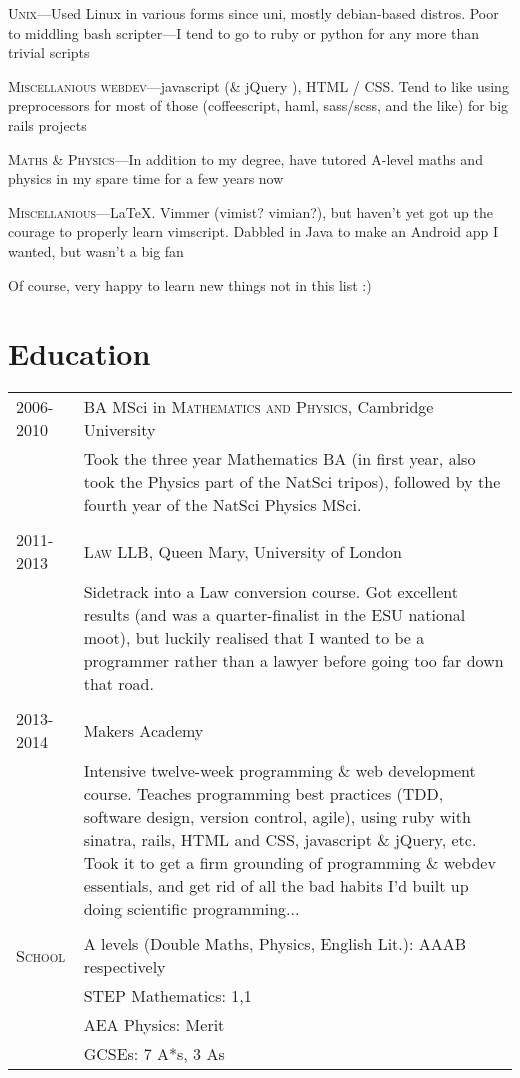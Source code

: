 \documentclass[a4paper,10pt]{article}
\begin{document}
\textsc{Unix}---Used Linux in various forms since uni, mostly debian-based
distros. Poor to middling bash scripter---I tend to go to ruby or python for any more than trivial scripts

\textsc{Miscellanious webdev}---javascript (\& jQuery ), HTML / CSS. Tend to like using preprocessors for most of those (coffeescript, haml, sass/scss, and the like) for big rails projects

\textsc{Maths \& Physics}---In addition to my degree, have tutored A-level maths and physics in my spare time for a few years now

\textsc{Miscellanious}---LaTeX. Vimmer (vimist? vimian?), but haven't yet got up the courage to properly learn vimscript. Dabbled in Java to make an Android app I wanted, but wasn't a big fan

Of course, very happy to learn new things not in this list :)



\section{Education}
\begin{tabularx}{\linewidth}{>{\raggedleft\hsize=0.42\hsize}X>{\hsize=1.5\hsize}X} 
  \textsc{2006-2010} & BA MSci in \textsc{Mathematics and Physics}, Cambridge University\\
  & \footnotesize{Took the three year Mathematics BA (in first year, also took the Physics part 
  of the NatSci tripos), followed by the fourth year of the NatSci Physics MSci.} \\
  \multicolumn{2}{c}{} \\
  \textsc{2011-2013} & \textsc{Law LLB}, Queen Mary, University of
  London\\
  & \footnotesize{Sidetrack into a Law conversion course. Got excellent results (and was a 
    quarter-finalist in the ESU national moot), but luckily realised that I wanted to be a 
  programmer rather than a lawyer before going too far down that road.} \\
  \multicolumn{2}{c}{} \\
  \textsc{2013-2014} & Makers Academy \\
  & \footnotesize{Intensive twelve-week programming \& web development course.
    Teaches programming best practices (TDD, software design, version control,
    agile), using ruby with sinatra, rails, HTML and CSS, javascript \& jQuery,
    etc. Took it to get a firm grounding of programming \& webdev essentials, and
  get rid of all the bad habits I'd built up doing scientific programming...} \\
  \multicolumn{2}{c}{} \\
  \textsc{School} & \footnotesize{A levels (Double Maths, Physics, English Lit.): AAAB respectively} \\
  & \footnotesize{STEP Mathematics: 1,1} \\
  & \footnotesize{AEA Physics: Merit} \\
  & \footnotesize{GCSEs: 7 A*s, 3 As}
\end{tabularx}
\end{document}
